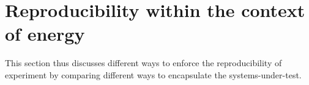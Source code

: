 




\section{Reproducibility within the context of energy}\label{sec:benchmarking_reproducibility}
This section thus discusses different ways to enforce the reproducibility of experiment by comparing different ways to encapsulate the systems-under-test.

